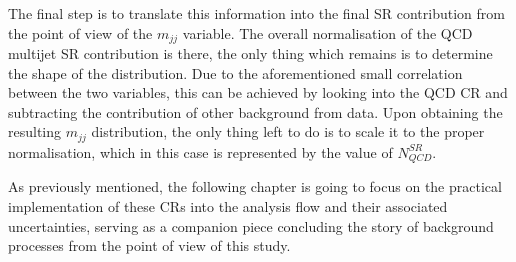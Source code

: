 \hspace{10pt} The final step is to translate this information into the final SR contribution from the point of view of the $m_{jj}$ variable. The overall normalisation of the QCD multijet SR contribution is there, the only thing which remains is to determine the shape of the distribution. Due to the aforementioned small correlation between the two variables, this can be achieved by looking into the QCD CR and subtracting the contribution of other background from data. Upon obtaining the resulting $m_{jj}$ distribution, the only thing left to do is to scale it to the proper normalisation, which in this case is represented by the value of $N_{QCD}^{SR}$.

\hspace{10pt} As previously mentioned, the following chapter is going to focus on the practical implementation of these CRs into the analysis flow and their associated uncertainties, serving as a companion piece concluding the story of background processes from the point of view of this study.

